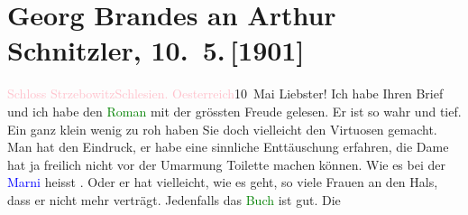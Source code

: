 

               \section[Georg Brandes an Arthur Schnitzler, 10. 5. {[}1901{]}]{ Georg Brandes an Arthur Schnitzler, 10. 5. {[}1901{]}}\nopagebreak{}\rehead{ }\normalsize\beginnumbering{} \toendnotes[C]{\smallbreak\pagebreak[2]} 
\toendnotes[C]{\smallbreak}\pstart
           \raggedleft{}{\pb}\textcolor{pink}{Schloss Strzebowitz}{}\ledrightnote{\textcolor{pink}{Schloss Strzebowitz}}{\\}\textcolor{pink}{Schlesien. Oesterreich}{}\ledrightnote{\textcolor{pink}{Schlesien}}{\\}10 Mai\pend
           \pstart
           Liebster! Ich habe Ihren Brief und ich habe den \textcolor{green}{Roman}{} mit der grössten
                    Freude gelesen. Er ist so wahr und tief. Ein ganz klein wenig zu roh haben Sie
                    doch vielleicht den Virtuosen gemacht. Man hat den Eindruck, er habe eine
                    sinnliche Enttäuschung erfahren, die Dame hat ja freilich nicht vor der Umarmung
                    Toilette machen können. Wie es bei der \textcolor{blue}{Marni}{}\ledrightnote{\textcolor{blue}{Jeanne Marni}} heisst \label{K_L01116_1v}\label{K_L01116_1h}. Oder er
                    hat vielleicht, wie es geht, so viele Frauen an den Hals, dass er nicht mehr
                    verträgt. Jedenfalls {\pb}das \textcolor{green}{Buch}{} ist gut. Die
